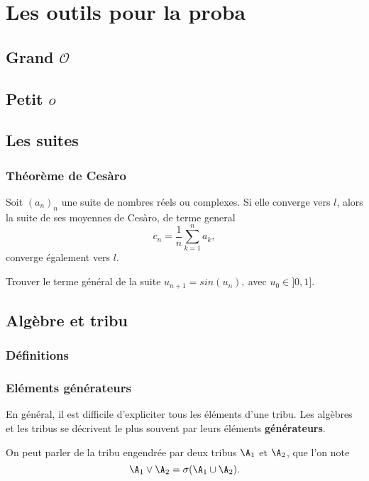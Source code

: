 \section{Les outils pour la proba}

\subsection{Grand $\mathcal{O}$}

\subsection{Petit $o$}

\subsection{Les suites}

\subsubsection{Théorème de Cesàro}
\bp
Soit $(a_n)_n$ une suite de nombres réels ou complexes. Si elle converge vers $l$, alors la suite de ses moyennes de Cesàro, de terme general $$c_n = \frac1n \sum_{k=1}^n a_k,$$ converge également vers $l$.
\ep

\bigskip

\be {}
Trouver le terme général de la suite $u_{n+1} = sin(u_n), ~ $avec $u_0 \in ]0,1].$ 
\ee

\subsection{Algèbre et tribu }
\subsubsection{Définitions}
\ed

\ed




\subsubsection{Eléments générateurs }
En général, il est difficile d'expliciter tous les éléments d'une tribu. Les algèbres et les tribus se décrivent le plus souvent par leurs éléments \textbf{générateurs}.
\bd[Générateurs]
\ed

On peut parler de la tribu engendrée par deux tribus $\A_1$ et $\A_2$, que l'on note $$\A_1\lor \A_2 = \sigma(\A_1 \cup \A_2).$$

